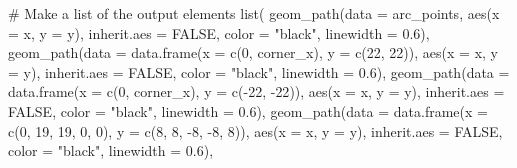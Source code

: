 \documentclass[
  9pt,
  ignorenonframetext,
  aspectratio=169]{beamer}
\newenvironment{Shaded}{\begin{snugshade}}{\end{snugshade}}
\newcommand{\AttributeTok}[1]{\textcolor[rgb]{0.00,0.34,0.68}{#1}}
\newcommand{\CommentTok}[1]{\textcolor[rgb]{0.54,0.53,0.53}{#1}}
\newcommand{\ConstantTok}[1]{\textcolor[rgb]{0.67,0.33,0.00}{#1}}
\newcommand{\DecValTok}[1]{\textcolor[rgb]{0.69,0.50,0.00}{#1}}
\newcommand{\FloatTok}[1]{\textcolor[rgb]{0.69,0.50,0.00}{#1}}
\newcommand{\FunctionTok}[1]{\textcolor[rgb]{0.39,0.29,0.61}{#1}}
\newcommand{\NormalTok}[1]{\textcolor[rgb]{0.12,0.11,0.11}{#1}}
\newcommand{\SpecialCharTok}[1]{\textcolor[rgb]{0.24,0.68,0.91}{#1}}
\newcommand{\StringTok}[1]{\textcolor[rgb]{0.75,0.01,0.01}{#1}}
\begin{document}
\begin{frame}[fragile]{}
\label{section}
\begin{Shaded}
\begin{Highlighting}[]
  \CommentTok{\# Make a list of the output elements}
  \FunctionTok{list}\NormalTok{(}
    \FunctionTok{geom\_path}\NormalTok{(}\AttributeTok{data =}\NormalTok{ arc\_points, }\FunctionTok{aes}\NormalTok{(}\AttributeTok{x =}\NormalTok{ x, }\AttributeTok{y =}\NormalTok{ y), }\AttributeTok{inherit.aes =} \ConstantTok{FALSE}\NormalTok{, }\AttributeTok{color =} \StringTok{"black"}\NormalTok{, }\AttributeTok{linewidth =} \FloatTok{0.6}\NormalTok{),}
    \FunctionTok{geom\_path}\NormalTok{(}\AttributeTok{data =} \FunctionTok{data.frame}\NormalTok{(}\AttributeTok{x =} \FunctionTok{c}\NormalTok{(}\DecValTok{0}\NormalTok{, corner\_x), }\AttributeTok{y =} \FunctionTok{c}\NormalTok{(}\DecValTok{22}\NormalTok{, }\DecValTok{22}\NormalTok{)),}
              \FunctionTok{aes}\NormalTok{(}\AttributeTok{x =}\NormalTok{ x, }\AttributeTok{y =}\NormalTok{ y), }\AttributeTok{inherit.aes =} \ConstantTok{FALSE}\NormalTok{, }\AttributeTok{color =} \StringTok{"black"}\NormalTok{, }\AttributeTok{linewidth =} \FloatTok{0.6}\NormalTok{),}
    \FunctionTok{geom\_path}\NormalTok{(}\AttributeTok{data =} \FunctionTok{data.frame}\NormalTok{(}\AttributeTok{x =} \FunctionTok{c}\NormalTok{(}\DecValTok{0}\NormalTok{, corner\_x), }\AttributeTok{y =} \FunctionTok{c}\NormalTok{(}\SpecialCharTok{{-}}\DecValTok{22}\NormalTok{, }\SpecialCharTok{{-}}\DecValTok{22}\NormalTok{)),}
              \FunctionTok{aes}\NormalTok{(}\AttributeTok{x =}\NormalTok{ x, }\AttributeTok{y =}\NormalTok{ y), }\AttributeTok{inherit.aes =} \ConstantTok{FALSE}\NormalTok{, }\AttributeTok{color =} \StringTok{"black"}\NormalTok{, }\AttributeTok{linewidth =} \FloatTok{0.6}\NormalTok{),}
    \FunctionTok{geom\_path}\NormalTok{(}\AttributeTok{data =} \FunctionTok{data.frame}\NormalTok{(}\AttributeTok{x =} \FunctionTok{c}\NormalTok{(}\DecValTok{0}\NormalTok{, }\DecValTok{19}\NormalTok{, }\DecValTok{19}\NormalTok{, }\DecValTok{0}\NormalTok{, }\DecValTok{0}\NormalTok{), }\AttributeTok{y =} \FunctionTok{c}\NormalTok{(}\DecValTok{8}\NormalTok{, }\DecValTok{8}\NormalTok{, }\SpecialCharTok{{-}}\DecValTok{8}\NormalTok{, }\SpecialCharTok{{-}}\DecValTok{8}\NormalTok{, }\DecValTok{8}\NormalTok{)),}
              \FunctionTok{aes}\NormalTok{(}\AttributeTok{x =}\NormalTok{ x, }\AttributeTok{y =}\NormalTok{ y), }\AttributeTok{inherit.aes =} \ConstantTok{FALSE}\NormalTok{, }\AttributeTok{color =} \StringTok{"black"}\NormalTok{, }\AttributeTok{linewidth =} \FloatTok{0.6}\NormalTok{),}

\end{Highlighting}
\end{Shaded}
\end{frame}
\end{document}
